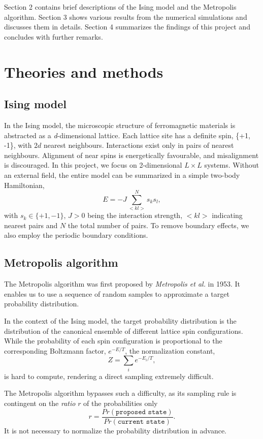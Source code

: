 \documentclass{article}
\begin{document}
Section 2 contains brief descriptions of the Ising model and the Metropolis algorithm. Section 3 shows various results from the numerical simulations and discusses them in details. Section 4 summarizes the findings of this project and concludes with further remarks. 

\section{Theories and methods}
\subsection{Ising model}
In the Ising model, the microscopic structure of ferromagnetic materials is abstracted as a \emph{d}-dimensional lattice. Each lattice site has a definite spin, \{+1, -1\}, with $2d$ nearest neighbours. Interactions exist only in pairs of nearest neighbours. Alignment of near spins is energetically favourable, and misalignment is discouraged. In this project, we focus on 2-dimensional $L\times L$ systems. Without an external field, the entire model can be summarized in a simple two-body Hamiltonian,
\begin{equation}
\label{ }
E = -J\sum_{<kl>}^{N} s_k s_l,
\end{equation}
with $s_k \in \{+1, -1\}$, $J > 0$ being the interaction strength, $<kl>$ indicating nearest pairs and $N$ the total number of pairs. \cite{notes} To remove boundary effects, we also employ the periodic boundary conditions.

\subsection{Metropolis algorithm}
The Metropolis algorithm was first proposed by \emph{Metropolis et al.} in 1953.\cite{Mpaper} It enables us to use a sequence of random samples to approximate a target probability distribution. 

In the context of the Ising model, the target probability distribution is the distribution of the canonical ensemble of different lattice spin configurations. While the probability of each spin configuration is proportional to the corresponding Boltzmann factor, $e^{-E/T}$, the normalization constant,
\begin{equation*}
Z = \sum_{i} e^{-E_i/T},
\end{equation*}
is hard to compute, rendering a direct sampling extremely difficult. 

The Metropolis algorithm bypasses such a difficulty, as its sampling rule is contingent on the \emph{ratio}  $r$ of the probabilities only
\begin{equation}
r = \frac{Pr(\texttt{proposed state})}{Pr(\texttt{current state})}.
\end{equation}
It is not necessary to normalize the probability distribution in advance. 
\end{document}
